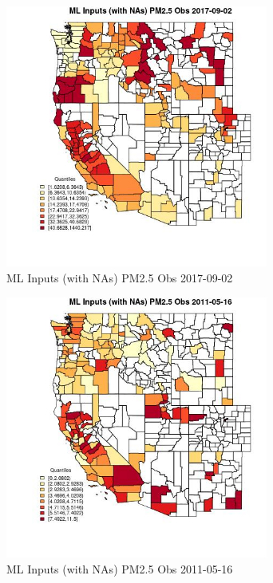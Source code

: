 \begin{figure} 
\centering  
\includegraphics[width=0.77\textwidth]{Code_Outputs/Report_ML_input_PM25_Step4_part_e_de_duplicated_aveswNAs_CountyPM25_ObsMean2017-09-02_2017-09-02.jpg} 
\caption{\label{fig:Report_ML_input_PM25_Step4_part_e_de_duplicated_aveswNAsCountyPM25_ObsMean2017-09-02_2017-09-02}ML Inputs (with NAs) PM2.5 Obs 2017-09-02} 
\end{figure} 
 

\begin{figure} 
\centering  
\includegraphics[width=0.77\textwidth]{Code_Outputs/Report_ML_input_PM25_Step4_part_e_de_duplicated_aveswNAs_CountyPM25_ObsMean2011-05-16_2011-05-16.jpg} 
\caption{\label{fig:Report_ML_input_PM25_Step4_part_e_de_duplicated_aveswNAsCountyPM25_ObsMean2011-05-16_2011-05-16}ML Inputs (with NAs) PM2.5 Obs 2011-05-16} 
\end{figure} 
 

